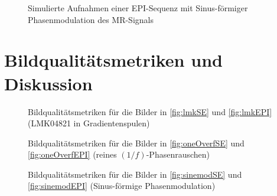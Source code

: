 \begin{figure}[H]
	\hfill
	\caption[Phasenmodulation (EPI-Sequenz)]{Simulierte Aufnahmen einer EPI-Sequenz mit Sinus-förmiger Phasenmodulation des MR-Signals}
	\label{fig:sinemodEPI}	
\end{figure}






\clearpage
\section{Bildqualitätsmetriken und Diskussion}

\begin{figure}[H]
	\centering
	\hfill
	\caption[Bildqualitätsmetriken LMK04821]{Bildqualitätsmetriken für die Bilder in \autoref{fig:lmkSE} und \autoref{fig:lmkEPI} (LMK04821 in Gradientenspulen)}
	\label{fig:metrikenLMK}	
\end{figure}

\begin{figure}[H]
	\centering
	\hfill
	\caption[Bildqualitätsmetriken ($1/f$)-Phasenrauschen]{Bildqualitätsmetriken für die Bilder in \autoref{fig:oneOverfSE} und \autoref{fig:oneOverfEPI} (reines $(1/f)$-Phasenrauschen)}
	\label{fig:metrikenOneOverf}	
\end{figure}

\begin{figure}[H]
	\centering
	\hfill
	\caption[Bildqualitätsmetriken Phasenmodulation]{Bildqualitätsmetriken für die Bilder in \autoref{fig:sinemodSE} und \autoref{fig:sinemodEPI} (Sinus-förmige Phasenmodulation)}
	\label{fig:metrikenSine}	
\end{figure}

